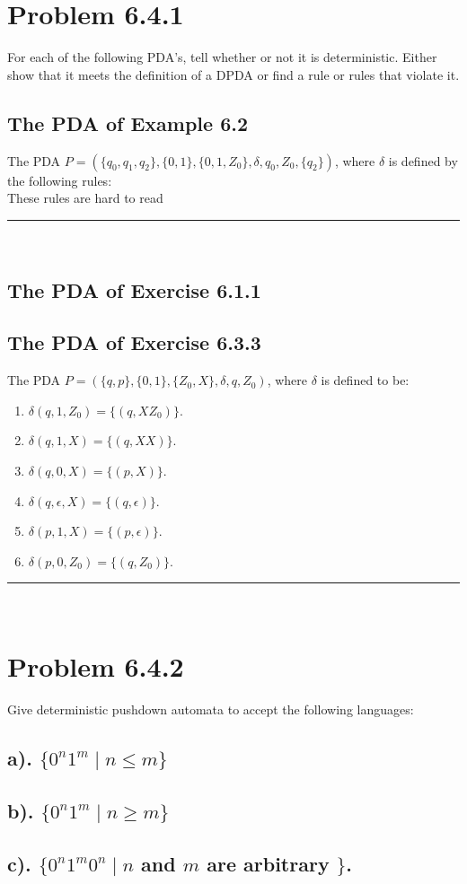 \documentclass[20pt]{article} %
\begin{document}
\section{Problem 6.4.1}
For each of the following PDA's, tell whether or not it is deterministic.  Either show that it meets the definition of a DPDA or find a rule or rules that violate it.
\subsection{The PDA of Example 6.2}
The PDA $\!P = (\{q_0, q_1, q_2\}, \{0,1\}, \{0,1,Z_0\}, \delta, q_0, Z_0, \{q_2\})$, where $\delta$ is defined by the following rules: \\ These rules are hard to read
\noindent\rule{2cm}{0.4pt} \\

\subsection{The PDA of Exercise 6.1.1}

\subsection{The PDA of Exercise 6.3.3}
The PDA $\!P = (\{q, p\}, \{0,1\}, \{Z_0,X\}, \delta, q , Z_0)$, where  $\delta$ is defined to be:
\begin{enumerate}
\item $\delta(q, 1, Z_0) = \{(q, XZ_0)\}$.
\item $\delta(q, 1, X) = \{(q, XX)\}$.
\item $\delta(q, 0, X) = \{(p, X)\}$.
\item $\delta(q, \epsilon, X) = \{(q, \epsilon)\}$.
\item $\delta(p, 1, X) = \{(p, \epsilon)\}$.
\item $\delta(p, 0, Z_0) = \{(q, Z_0)\}$.
\end{enumerate}
\noindent\rule{2cm}{0.4pt} \\

\section{Problem 6.4.2}
Give deterministic pushdown automata to accept the following languages:
\subsection{a). $\{0^{n}1^{m} \mid n \leq m\}$}
\subsection{b). $\{0^{n}1^{m} \mid n \geq m\}$}
\subsection{c). $\{0^{n}1^{m}0^{n} \mid n$ and $m$ are arbitrary $\}$.}
\end{document}
